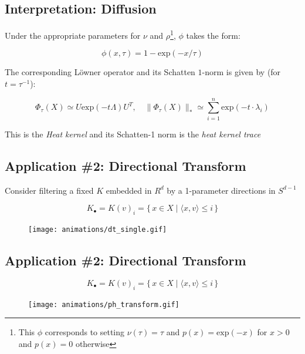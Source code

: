 \documentclass[
  letterpaper,
  DIV=11,
  numbers=noendperiod,
  oneside]{scrartcl}
\begin{document}
\subsection{Interpretation: Diffusion}\label{interpretation-diffusion-1}

Under the appropriate parameters for \(\nu\) and \(\rho\)\footnote{This
  \(\phi\) corresponds to setting \(\nu(\tau) = \tau\) and
  \(p(x) = \mathrm{exp}(-x)\) for \(x > 0\) and \(p(x) = 0\) otherwise},
\(\phi\) takes the form:

\[
\phi(x, \tau) = 1 - \mathrm{exp}(- x / \tau)
\]

The corresponding Löwner operator and its Schatten \(1\)-norm is given
by (for \(t = \tau^{-1}\)):

\[
\Phi_\tau(X) \simeq U \mathrm{exp}(-t \Lambda) U^T, \quad \lVert \Phi_\tau(X) \rVert_\ast \simeq \sum\limits_{i = 1}^n \mathrm{exp}(-t \cdot \lambda_i)
\]

This is the { \emph{Heat kernel} } and its Schatten-1 norm is the {
\emph{heat kernel trace} }

\subsection{Application \#2: Directional
Transform}\label{application-2-directional-transform}

Consider filtering a fixed \(K\) embedded in \(R^d\) by a 1-parameter
directions in \(S^{d-1}\)

\[
K_\bullet = K(v)_i = \{\, x \in X \mid \langle x, v \rangle \leq i  \,\}
\]

\begin{figure}

{\centering \texttt{[image: animations/dt\_single.gif]}

}

\end{figure}

\subsection{Application \#2: Directional
Transform}\label{application-2-directional-transform-1}

\[
K_\bullet = K(v)_i = \{\, x \in X \mid \langle x, v \rangle \leq i  \,\}
\]

\begin{figure}

{\centering \texttt{[image: animations/ph\_transform.gif]}

}

\end{figure}
\end{document}
